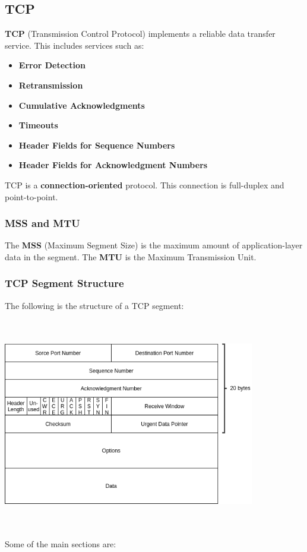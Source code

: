 \documentclass{article}
\begin{document}
\subsection{TCP}
\textbf{TCP} (Transmission Control Protocol) implements a reliable data transfer service. This includes services such as:

\begin{itemize}
	\item \textbf{Error Detection}
	\item \textbf{Retransmission}
	\item \textbf{Cumulative Acknowledgments}
	\item \textbf{Timeouts}
	\item \textbf{Header Fields for Sequence Numbers}
	\item \textbf{Header Fields for Acknowledgment Numbers}
\end{itemize}
TCP is a \textbf{connection-oriented} protocol. This connection is full-duplex and point-to-point.

\subsubsection{MSS and MTU}
The \textbf{MSS} (Maximum Segment Size) is the maximum amount of application-layer data in the segment. The \textbf{MTU} is the Maximum Transmission Unit.

\subsubsection{TCP Segment Structure}
The following is the structure of a TCP segment: \\ \\ \\
\centerline{\includegraphics[width=11cm]{./assets/tcp.png}} \\ \\
Some of the main sections are:
\end{document}
